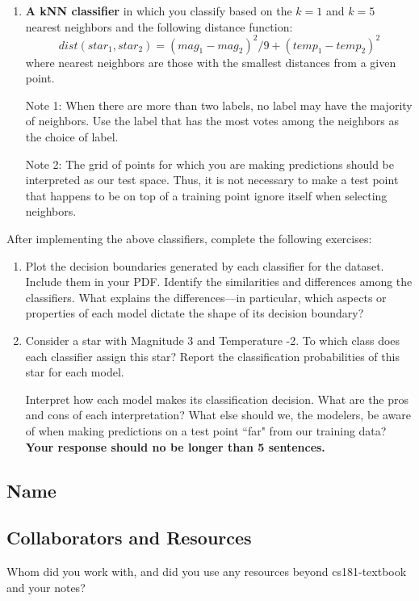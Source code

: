 \documentclass[submit]{harvardml}
\begin{document}
\begin{problem}
\begin{enumerate}[label=\alph*)]
\item \textbf{A kNN classifier} in which you classify based on the $k = 1$ and $k = 5$ nearest neighbors and the following distance function: $$dist(star_1, star_2) = (mag_1 - mag_2)^2/9 + (temp_1 - temp_2)^2$$
where nearest neighbors are those with the smallest distances from a given point.

  Note 1: When there are more than two labels, no label may have the
  majority of neighbors.  Use the label that has the most votes among
  the neighbors as the choice of label. 

  Note 2: The grid of points for which you are making predictions
  should be interpreted as our test space.  Thus, it is not necessary
  to make a test point that happens to be on top of a training point
  ignore itself when selecting neighbors.

\end{enumerate}

After implementing the above classifiers, complete the following exercises:

\begin{enumerate}
    \item Plot the decision boundaries generated by each classifier for the dataset. Include them in your PDF. 
    Identify the similarities and differences among the classifiers. What explains the differences---in particular, which aspects or properties of each model dictate the shape of its decision boundary? 
    
    \item 
    
    Consider a star with Magnitude 3 and Temperature -2. To which class does each classifier assign this star? Report the classification probabilities of this star for each model. 
    
    Interpret how each model makes its classification decision. What are the pros and cons of each interpretation? What else should we, the modelers, be aware of when making predictions on a test point ``far" from our training data? \textbf{Your response should no be longer than 5 sentences.}
\end{enumerate}
\end{problem}

\subsection*{Name}

\subsection*{Collaborators and Resources}
Whom did you work with, and did you use any resources beyond cs181-textbook and your notes?
\end{document}
